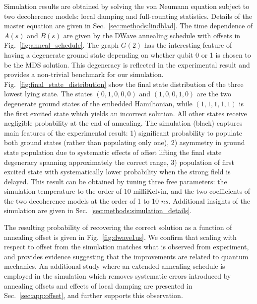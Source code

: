 \documentclass[prd,twocolumn,tightenlines,preprintnumbers,showpacs,superscriptaddress,notitlepage,nofootinbib,eqsecnum,floatfix,longbibliography,aps,10pt]{revtex4-2}
\begin{document}
Simulation results are obtained by solving the von Neumann equation subject to two decoherence models: local damping and full-counting statistics.
Details of the master equation are given in Sec.~\ref{sec:methods:lindblad}. The time dependence of $A(s)$ and $B(s)$ are given by the DWave annealing schedule with offsets in Fig.~\ref{fig:anneal_schedule}.
The graph $G(2)$ has the interesting feature of having a degenerate ground state depending on whether qubit 0 or 1 is chosen to be the MDS solution.
This degeneracy is reflected in the experimental result and provides a non-trivial benchmark for our simulation.
Fig.~\ref{fig:final_state_distribution} show the final state distribution of the three lowest lying state.
The states $(0, 1, 0, 0, 0)$ and $(1, 0, 0, 1, 0)$ are the two degenerate ground states of the embedded Hamiltonian, while $(1, 1, 1, 1, 1)$ is the first excited state which yields an incorrect solution.
All other states receive negligible probability at the end of annealing.
The simulation (black) captures main features of the experimental result: 1) significant probability to populate both ground states (rather than populating only one), 2) asymmetry in ground state population due to systematic effects of offset lifting the final state degeneracy spanning approximately the correct range, 3) population of first excited state with systematically lower probability when the strong field is delayed.
This result can be obtained by tuning three free parameters: the simulation temperature to the order of 10 milliKelvin, and the two coefficients of the two decoherence models at the order of 1 to 10 $ns$.
Additional insights of the simulation are given in Sec.~\ref{sec:methods:simulation_details}.

The resulting probability of recovering the correct solution as a function of annealing offset is given in Fig.~\ref{fig:dwave1us}.
We confirm that scaling with respect to offset from the simulation matches what is observed from experiment, and provides evidence suggesting that the improvements are related to quantum mechanics.
An additional study where an extended annealing schedule is employed in the simulation which removes systematic errors introduced by annealing offsets and effects of local damping are presented in Sec.~\ref{sec:app:offset}, and further supports this observation.
\end{document}

